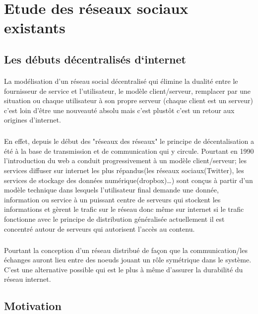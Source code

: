 \newpage
\section{Etude des réseaux sociaux existants}
\subsection{Les débuts décentralisés d‘internet} 
\paragraph{}
La modélisation d'un réseau social décentralisé qui élimine la dualité entre le fournisseur de service et l'utilisateur, le modèle client/serveur, remplacer par une situation ou chaque utilisateur à son propre serveur (chaque client est un serveur) c'est loin d'être une nouveauté absolu mais c'est plustôt c'est un retour aux origines d'internet.
\subparagraph{} 
En effet, depuis le début des "réseaux des réseaux" le principe de décentalisation a été à la base de transmission et de communication qui y circule.  Pourtant en 1990 l'introduction du web a conduit progressivement à un modèle client/serveur;  les services diffuser sur internet les plus répandus(les réseaux sociaux(Twitter), les services de stockage des données numérique(dropbox)…)
sont conçus à partir d'un modèle technique dans lesquels l'utilisateur final demande une donnée, information ou service à un puissant centre de serveurs qui stockent les informations et gèrent le trafic sur le réseau donc même sur internet si le trafic fonctionne avec le principe de distribution généralisée actuellement il est concentré autour de serveurs qui autorisent l'accès au contenu.
\subparagraph{}
Pourtant la conception d'un réseau distribué de façon que la communication/les échanges auront lieu entre des noeuds jouant un rôle symétrique dans le système. C'est une alternative possible qui est le plus à même d'assurer la durabilité du réseau internet.
\subsection{Motivation} 
